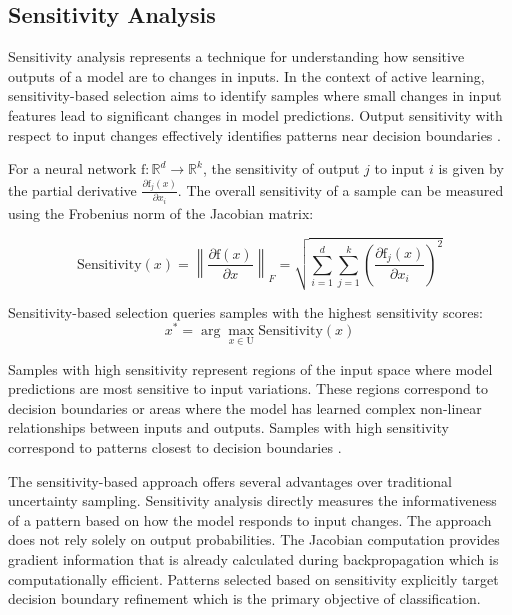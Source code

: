 \documentclass[conference]{IEEEtran}
\newcommand{\set}[1]{\mathrm{#1}}  %
\newcommand{\func}[1]{\mathrm{#1}} %
\begin{document}
\subsection{Sensitivity Analysis}

Sensitivity analysis represents a technique for understanding how sensitive outputs of a model are to changes in inputs. In the context of active learning, sensitivity-based selection aims to identify samples where small changes in input features lead to significant changes in model predictions. Output sensitivity with respect to input changes effectively identifies patterns near decision boundaries \cite{engelbrecht2001sensitivity}.

For a neural network $\func{f}: \mathbb{R}^d \rightarrow \mathbb{R}^k$, the sensitivity of output $j$ to input $i$ is given by the partial derivative $\frac{\partial \func{f}_j(x)}{\partial x_i}$. The overall sensitivity of a sample can be measured using the Frobenius norm of the Jacobian matrix:

\begin{equation}
\text{Sensitivity}(x) = \left\|\frac{\partial \func{f}(x)}{\partial x}\right\|_F = \sqrt{\sum_{i=1}^d \sum_{j=1}^k \left(\frac{\partial \func{f}_j(x)}{\partial x_i}\right)^2}
\end{equation}

Sensitivity-based selection queries samples with the highest sensitivity scores:
\begin{equation}
x^* = \arg\max_{x \in \set{U}} \text{Sensitivity}(x)
\end{equation}

Samples with high sensitivity represent regions of the input space where model predictions are most sensitive to input variations. These regions correspond to decision boundaries or areas where the model has learned complex non-linear relationships between inputs and outputs. Samples with high sensitivity correspond to patterns closest to decision boundaries \cite{engelbrecht2001sensitivity}.

The sensitivity-based approach offers several advantages over traditional uncertainty sampling. Sensitivity analysis directly measures the informativeness of a pattern based on how the model responds to input changes. The approach does not rely solely on output probabilities. The Jacobian computation provides gradient information that is already calculated during backpropagation which is computationally efficient. Patterns selected based on sensitivity explicitly target decision boundary refinement which is the primary objective of classification.
\end{document}
